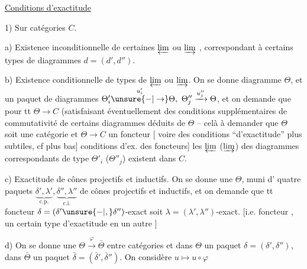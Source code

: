 
\uline{Conditions d'exactitude}\par 1) Sur catégories $C$.

a) Existence inconditionnelle de certaines $\varprojlim$ ou $\varinjlim$ , correspondant à certains types de diagrammes $d=(d',d'')$.



b) Existence conditionnelle de types de $\varprojlim$ ou $\varinjlim$. On se donne  diagramme $\Theta$, et  un paquet de diagrammes  $\Theta'_i\overset{u'_i}{\unsure{-|\to}}\Theta,\ \Theta''_j\xrightarrow{u''_j}\Theta$, et on demande que pour tt $\Theta\to C$ (satisfaisant éventuellement des conditions supplémentaires de commutativité de certains diagrammes déduits de $\Theta$ -- celà  à demander que $\Theta$ soit une catégorie et $\Theta\to C$ un foncteur [ voire des conditions ``d'exactitude'' plus subtiles, cf plus bas] conditions d'ex. des foncteurs] les $\varprojlim$ ($\varinjlim$) des diagrammes correspondants de type $\Theta'_i$ ($\Theta''_j$) existent dans $C$.


c) Exactitude de cônes projectifs et inductifs. On se donne une  $\Theta$, muni d' quatre paquets $\underbrace{\delta',\lambda'}_{\mathrm{c.p.}},\underbrace{\delta'',\lambda''}_{\mathrm{c.i.}}$ de cônes projectifs et inductifs, et on demande que tt foncteur $\delta=(\delta'\unsure{-|,}\delta'')$-exact soit $\lambda=(\lambda',\lambda'')$-exact. [i.e.   foncteur , un certain type d'exactitude en  un  autre ]


d) On se donne une  $\Theta\xrightarrow{\varphi}\bar\Theta$ entre catégories et dans $\Theta$ un paquet $\delta=(\delta',\delta'')$, dans $\bar\Theta$ un paquet $\bar\delta=(\bar\delta',\bar\delta'')$. On considère $u\longmapsto u\circ\varphi$


